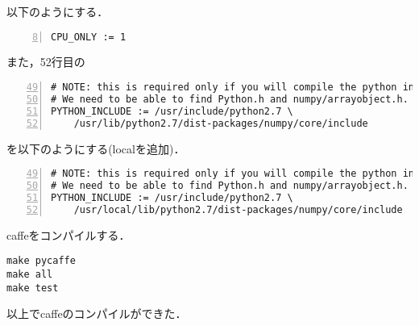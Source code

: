 \documentclass[a4paper,10pt]{jsarticle}
\begin{document}
以下のようにする．
\begin{lstlisting}[basicstyle=\ttfamily\footnotesize, frame=single,  firstnumber=8, numbers=left]
CPU_ONLY := 1
\end{lstlisting}
また，52行目の
\begin{lstlisting}[basicstyle=\ttfamily\footnotesize, frame=single, firstnumber=49, numbers=left]
# NOTE: this is required only if you will compile the python interface.
# We need to be able to find Python.h and numpy/arrayobject.h.
PYTHON_INCLUDE := /usr/include/python2.7 \
    /usr/lib/python2.7/dist-packages/numpy/core/include
\end{lstlisting}
を以下のようにする(localを追加)．
\begin{lstlisting}[basicstyle=\ttfamily\footnotesize, frame=single, firstnumber=49, numbers=left]
# NOTE: this is required only if you will compile the python interface.
# We need to be able to find Python.h and numpy/arrayobject.h.
PYTHON_INCLUDE := /usr/include/python2.7 \
    /usr/local/lib/python2.7/dist-packages/numpy/core/include
\end{lstlisting}
caffeをコンパイルする．
\begin{lstlisting}[basicstyle=\ttfamily\footnotesize, frame=single]
make pycaffe
make all
make test
\end{lstlisting}
以上でcaffeのコンパイルができた．
\end{document}

